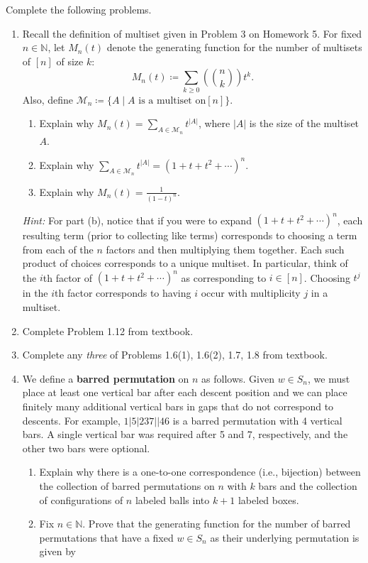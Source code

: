 \documentclass[11pt]{article}%
\theoremstyle{definition}
\begin{document}
Complete the following problems. 
\begin{enumerate}
	
\item Recall the definition of multiset given in Problem 3 on Homework 5.  For fixed $n\in \mathbb{N}$, let $M_n(t)$ denote the generating function for the number of multisets of $[n]$ of size $k$:
\[
M_n(t)\coloneqq \sum_{k\geq 0}\left(\binom{n}{k}\right)t^k.
\]
Also, define $\mathcal{M}_n\coloneqq \{A\mid A\text{ is a multiset on}[n]\}$.
\begin{enumerate}
\item Explain why $\displaystyle M_n(t)=\sum_{A\in\mathcal{M}_n} t^{|A|}$, where $|A|$ is the size of the multiset $A$.
\item Explain why $\displaystyle \sum_{A\in\mathcal{M}_n} t^{|A|}=(1+t+t^2+\cdots)^n$.
\item Explain why $\displaystyle M_n(t)=\frac{1}{(1-t)^n}$.
\end{enumerate}
\emph{Hint:} For part (b), notice that if you were to expand $(1+t+t^2+\cdots)^n$, each resulting term (prior to collecting like terms) corresponds to choosing a term from each of the $n$ factors and then multiplying them together.  Each such product of choices corresponds to a unique multiset.  In particular, think of the $i$th factor of $(1+t+t^2+\cdots)^n$ as corresponding to $i\in [n]$.  Choosing $t^j$ in the $i$th factor corresponds to having $i$ occur with multiplicity $j$ in a multiset.
\item Complete Problem 1.12 from textbook.
\item Complete any \emph{three} of Problems 1.6(1), 1.6(2), 1.7, 1.8 from textbook.
\item We define a \textbf{barred permutation} on $n$ as follows.  Given $w\in S_n$, we must place at least one vertical bar after each descent position and we can place finitely many additional vertical bars in gaps that do not correspond to descents.  For example, $1|5|237||46$ is a barred permutation with 4 vertical bars.  A single vertical bar was required after 5 and 7, respectively, and the other two bars were optional.
\begin{enumerate}
\item Explain why there is a one-to-one correspondence (i.e., bijection) between the collection of barred permutations on $n$ with $k$ bars and the collection of configurations of $n$ labeled balls into $k+1$ labeled boxes.
\item Fix $n\in \mathbb{N}$. Prove that the generating function for the number of barred permutations that have a fixed $w\in S_n$ as their underlying permutation is given by

\end{enumerate}
\end{enumerate}
\end{document}
